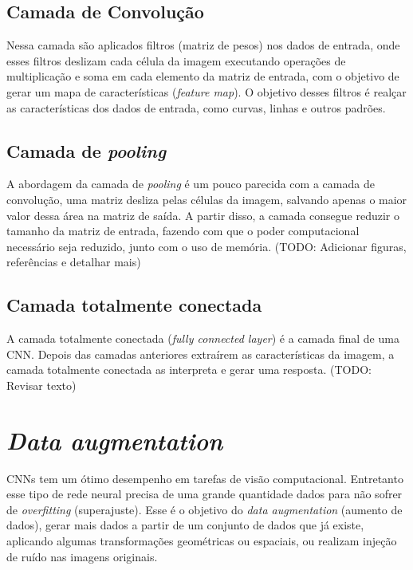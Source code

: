 \subsection{Camada de Convolução}\label{cap_conceitos_cnn_conv}
Nessa camada são aplicados filtros (matriz de pesos) nos dados de entrada,
onde esses filtros deslizam cada célula da imagem executando operações de multiplicação e soma
em cada elemento da matriz de entrada, com o objetivo de gerar um mapa de características (\textit{feature map}).
O objetivo desses filtros é realçar as características dos dados de entrada, como curvas, linhas e outros padrões.


\subsection{Camada de \textit{pooling}}\label{cap_conceitos_cnn_pooling}
A abordagem da camada de \textit{pooling} é um pouco parecida com a camada de convolução,
uma matriz desliza pelas células da imagem, salvando apenas o maior valor dessa área na matriz de saída.
A partir disso, a camada consegue reduzir o tamanho da matriz de entrada, fazendo com que o poder computacional
necessário seja reduzido, junto com o uso de memória.
(TODO: Adicionar figuras, referências e detalhar mais)

\subsection{Camada totalmente conectada}\label{cap_conceitos_cnn_totalmente}
A camada totalmente conectada (\textit{fully connected layer}) é a camada final de uma CNN.
Depois das camadas anteriores extraírem as características da imagem, a camada totalmente
conectada as interpreta e gerar uma resposta.
(TODO: Revisar texto)

\section{\textit{Data augmentation}}
CNNs tem um ótimo desempenho em tarefas de visão computacional. Entretanto esse tipo de rede neural precisa de uma
grande quantidade dados para não sofrer de \textit{overfitting} (superajuste). \cite{shorten2019survey}
Esse é o objetivo do \textit{data augmentation} (aumento de dados), gerar mais dados a partir de um conjunto de dados
que já existe, aplicando algumas transformações geométricas ou espaciais, ou realizam injeção de ruído nas imagens
originais.

